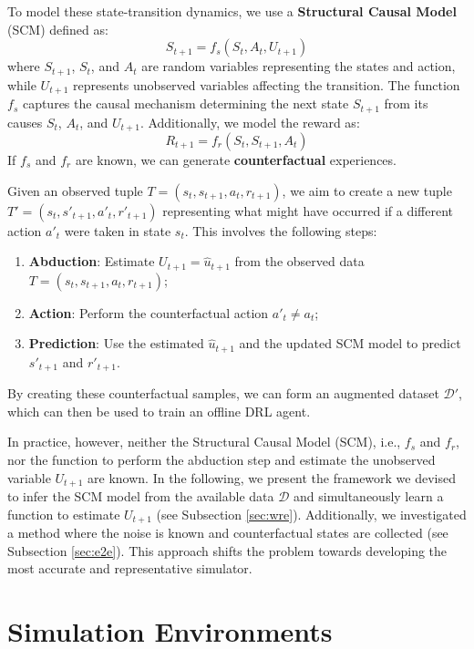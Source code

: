 To model these state-transition dynamics, we use a
\textbf{Structural Causal Model} (SCM)
defined as:
\[
S_{t+1} = f_s(S_t, A_t, U_{t+1})
\]
where \( S_{t+1} \), \( S_t \), and \( A_t \) are random variables representing
the states and action, while \( U_{t+1} \) represents unobserved
variables affecting the transition.
The function \( f_s \) captures the causal mechanism
determining the next state \( S_{t+1} \) from its causes
\( S_t \), \( A_t \), and \( U_{t+1} \).
Additionally, we model the reward as:
\[
R_{t+1} = f_r(S_t, S_{t+1}, A_t)
\]
If \( f_s \) and \( f_r \) are known, we can generate
\textbf{counterfactual} experiences.

Given an observed tuple \( T = (s_t, s_{t+1}, a_t, r_{t+1}) \),
we aim to create a new tuple \( T' = (s_t, s'_{t+1}, a'_t, r'_{t+1}) \)
representing what might have occurred if a different action \( a'_t \)
were taken in state \( s_t \). This involves the following steps:
\begin{enumerate}
    \item \textbf{Abduction}: Estimate \( U_{t+1} = \hat{u}_{t+1} \)
    from the observed data \( T = (s_t, s_{t+1}, a_t, r_{t+1}) \);
    \item \textbf{Action}: Perform the counterfactual action
    \( a'_t \neq a_t \);
    \item \textbf{Prediction}: Use the estimated \( \hat{u}_{t+1} \)
    and the updated SCM model to predict \( s'_{t+1} \) and \( r'_{t+1} \).
\end{enumerate}

By creating these counterfactual samples, we can form an augmented dataset
\( \mathcal{D}' \), which can then be used to train an offline DRL agent.

In practice, however, neither the Structural Causal Model (SCM),
i.e., \( f_s \) and \( f_r \), nor the function to perform
the abduction step and estimate the unobserved variable
\( U_{t+1} \) are known. In the following, we present the framework
we devised to infer the SCM model from the available data \( \mathcal{D} \)
and simultaneously learn a function to estimate
\( U_{t+1} \) (see Subsection \ref{sec:wre}). Additionally, we investigated
a method where the noise is known and counterfactual states are collected
(see Subsection \ref{sec:e2e}).
This approach shifts the problem towards developing the most accurate and
representative simulator.

\section{Simulation Environments}

